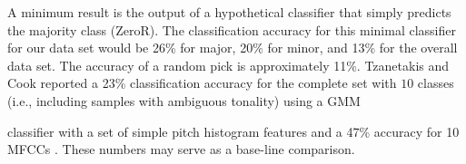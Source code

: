\documentclass{article}
\begin{document}
A minimum result is the output of a hypothetical classifier that simply predicts the majority class (ZeroR). The classification accuracy for this minimal classifier for our data set would be 26\% for major, 20\% for minor, and 13\% for the overall data set. The accuracy of a random pick is approximately 11\%. Tzanetakis and Cook reported a 23\% classification accuracy  for the complete set with $10$ classes (i.e., including samples with ambiguous tonality) using a GMM 
%
%
\begin{table}[t]
\begin{center}
    \caption{Average classification accuracy and standard deviation over folds for different feature combinations.}
    \label{tab:accuracyPC}
  \end{center}
\end{table}
%
classifier with a set of simple pitch histogram features and a 47\% accuracy for 10 MFCCs \cite{tzanetakis_musical_2002}. These numbers may serve as a base-line comparison. 
\end{document}
